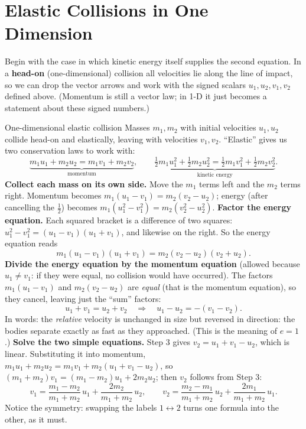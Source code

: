 \section{Elastic Collisions in One Dimension}

Begin with the case in which kinetic energy itself supplies the second equation. In a \textbf{head-on}
(one-dimensional) collision all velocities lie along the line of impact, so we can drop the vector arrows
and work with the signed scalars $u_1,u_2,v_1,v_2$ defined above. (Momentum is still a vector law; in 1-D
it just becomes a statement about these signed numbers.)

\begin{derivbox}{One-dimensional elastic collision}
Masses $m_1,m_2$ with initial velocities $u_1,u_2$ collide head-on and elastically, leaving with
velocities $v_1,v_2$. ``Elastic'' gives us two conservation laws to work with:
\[
\underbrace{m_1u_1+m_2u_2=m_1v_1+m_2v_2}_{\text{momentum}},\qquad
\underbrace{\tfrac12m_1u_1^2+\tfrac12m_2u_2^2=\tfrac12m_1v_1^2+\tfrac12m_2v_2^2}_{\text{kinetic energy}}.
\]
 \textbf{Collect each mass on its own side.} Move the $m_1$ terms left and the $m_2$ terms right.
Momentum becomes $m_1(u_1-v_1)=m_2(v_2-u_2)$; energy (after cancelling the $\tfrac12$) becomes
$m_1(u_1^2-v_1^2)=m_2(v_2^2-u_2^2)$.
 \textbf{Factor the energy equation.} Each squared bracket is a difference of two squares:
$u_1^2-v_1^2=(u_1-v_1)(u_1+v_1)$, and likewise on the right. So the energy equation reads
\[
m_1(u_1-v_1)(u_1+v_1)=m_2(v_2-u_2)(v_2+u_2).
\]
 \textbf{Divide the energy equation by the momentum equation} (allowed because $u_1\ne v_1$: if
they were equal, no collision would have occurred). The factors
$m_1(u_1-v_1)$ and $m_2(v_2-u_2)$ are \emph{equal} (that is the momentum equation), so they cancel,
leaving just the ``sum'' factors:
\[
u_1+v_1=u_2+v_2\quad\Longrightarrow\quad \boxed{u_1-u_2=-(v_1-v_2)}.
\]
In words: the \emph{relative} velocity is unchanged in size but reversed in direction: the bodies
separate exactly as fast as they approached. (This is the meaning of $e=1$.)
 \textbf{Solve the two simple equations.} Step 3 gives $v_2=u_1+v_1-u_2$, which is linear.
Substituting it into momentum, $m_1u_1+m_2u_2=m_1v_1+m_2(u_1+v_1-u_2)$, so
$(m_1+m_2)v_1=(m_1-m_2)u_1+2m_2u_2$; then $v_2$ follows from Step 3:
\[
v_1=\frac{m_1-m_2}{m_1+m_2}\,u_1+\frac{2m_2}{m_1+m_2}\,u_2,\qquad
v_2=\frac{m_2-m_1}{m_1+m_2}\,u_2+\frac{2m_1}{m_1+m_2}\,u_1.
\]
Notice the symmetry: swapping the labels $1\leftrightarrow2$ turns one formula into the other, as it must.
\end{derivbox}

